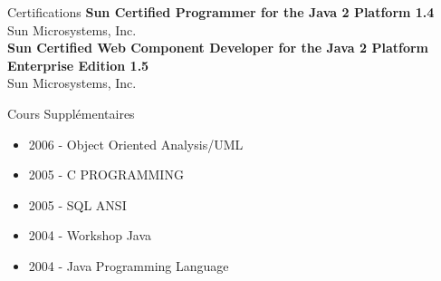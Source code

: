 \documentclass{resume}
\begin{document}
  \begin{rSection}{Certifications}
    {\bf Sun Certified Programmer for the Java 2 Platform 1.4}\\ 
    {Sun Microsystems, Inc.} \\

    {\bf Sun Certified Web Component Developer for the Java 2 Platform Enterprise Edition 1.5}\\ 
    {Sun Microsystems, Inc.} \\
  \end{rSection}

  \begin{rSection}{Cours Supplémentaires}
  \end{rSection}  

  \begin{itemize}
    \item 2006 - Object Oriented Analysis/UML
    \item 2005 - C PROGRAMMING
    \item 2005 - SQL ANSI
    \item 2004 - Workshop Java
    \item 2004 - Java Programming Language
  \end{itemize}

  
\end{document}
